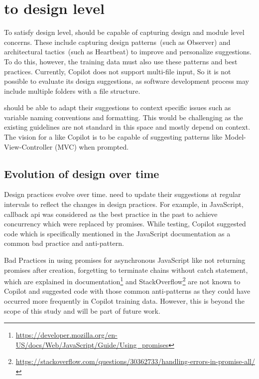 \section{\cct{} to design level}
\label{cs2design}
To satisfy design level, \cct{} should be capable of capturing design and module level concerns. 
These include capturing design patterns~(such as Observer) and architectural tactics~(such as Heartbeat) to improve and personalize suggestions.
To do this, however, the training data must also use these patterns and best practices.
Currently, Copilot does not support multi-file input, So it is not possible to evaluate its design suggestions, as software development process may include multiple folders with a file structure. 

\cct{} should be able to adapt their suggestions to context specific issues such as variable naming conventions and formatting. 
This would be challenging as the existing guidelines are not standard in this space and mostly depend on context.
The vision for a \cct{} like Copilot is to be capable of suggesting patterns like Model-View-Controller (MVC) when prompted.

\subsection{Evolution of design over time}
\label{evolution}
Design practices evolve over time. \cct{} need to update their suggestions at regular intervals to reflect the changes in design practices. 
For example, in JavaScript, callback api was considered as the best practice in the past to achieve concurrency which were replaced by promises. 
While testing, Copilot suggested code which is specifically mentioned in the JavaScript documentation as a common bad practice and anti-pattern.

Bad Practices in using promises for asynchronous JavaScript like not returning promises after creation, forgetting to terminate chains without catch statement, which are explained in documentation\footnote{\label{docs}\url{https://developer.mozilla.org/en-US/docs/Web/JavaScript/Guide/Using_promises}} and StackOverflow\footnote{\url{https://stackoverflow.com/questions/30362733/handling-errors-in-promise-all/}} are not known to Copilot and suggested code with those common anti-patterns as they could have occurred more frequently in Copilot training data. 
However, this is beyond the scope of this study and will be part of future work.